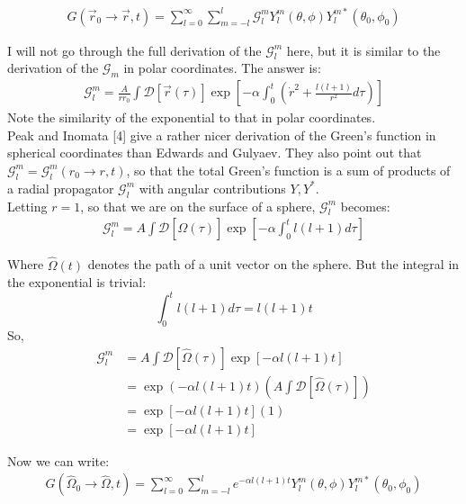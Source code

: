 \documentclass[12pt,a4paper]{article}
\begin{document}
\begin{align*}
G(\vec{r}_0\rightarrow \vec{r}, t) = \sum_{l=0}^{\infty}\sum_{m=-l}^l\mathcal{G}_l^m Y_l^m(\theta, \phi)Y_l^{m*}(\theta_0, \phi_0)
\end{align*}

I will not go through the full derivation of the $\mathcal{G}_l^m$ here, but it is similar to the derivation of the $\mathcal{G}_m$ in polar coordinates. The answer is:
\begin{align*}
\mathcal{G}_l^m = \frac{A}{rr_0}\int \mathcal{D}[\vec{r}(\tau)]\exp\left[-\alpha\int_0^t\left(\dot{r}^2 + \frac{l(l+1)}{r^2}d\tau\right)\right]
\end{align*}
Note the similarity of the exponential to that in polar coordinates. \\

Peak and Inomata [4] give a rather nicer derivation of the Green's function in spherical coordinates than Edwards and Gulyaev. They also point out that $\mathcal{G}_l^m=\mathcal{G}_l^m(r_0\rightarrow r, t)$, so that the total Green's function is a sum of products of a radial propagator $\mathcal{G}_l^m$ with angular contributions $Y, Y^*$.\\

Letting $r=1$, so that we are on the surface of a sphere, $\mathcal{G}_l^m$ becomes:
\begin{align*}
\mathcal{G}_l^m = A\int \mathcal{D}[\hat{\Omega}(\tau)]\exp\left[-\alpha\int_0^tl(l+1)d\tau\right]
\end{align*}

Where $\hat{\Omega}(t)$ denotes the path of a unit vector on the sphere. But the integral in the exponential is trivial:
\[
\int_0^tl(l+1)d\tau = l(l+1)t
\]
So,
\begin{align*}
\mathcal{G}_l^m &= A\int \mathcal{D}[\hat{\Omega}(\tau)]\exp\left[-\alpha l(l+1) t\right] \\
&=\exp\left(-\alpha l(l+1) t\right) \left( A\int \mathcal{D}[\hat{\Omega}(\tau)]\right)\\
&= \exp\left[-\alpha l(l+1) t\right](1)\\
&= \exp\left[-\alpha l(l+1) t\right]
\end{align*}

Now we can write:
\begin{align*}
G(\hat{\Omega}_0\rightarrow \hat{\Omega}, t) = \sum_{l=0}^\infty \sum_{m=-l}^l e^{-\alpha l(l+1)t}Y_l^m(\theta, \phi) Y_l^{m*}(\theta_0, \phi_0)
\end{align*}
\end{document}
